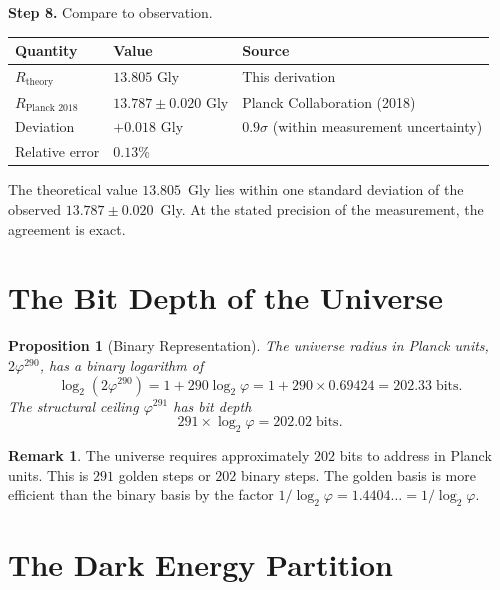 \documentclass[11pt,a4paper]{article}
\theoremstyle{plain}
\newtheorem{proposition}[theorem]{Proposition}
\theoremstyle{definition}
\newtheorem{remark}[theorem]{Remark}
\newcommand{\vp}{\varphi}
\begin{document}
\textbf{Step 8.}  Compare to observation.

\begin{table}[h]
\centering
\begin{tabular}{@{}lll@{}}
\toprule
Quantity & Value & Source \\
\midrule
$R_{\text{theory}}$ & $13.805$ Gly & This derivation \\
$R_{\text{Planck 2018}}$ & $13.787 \pm 0.020$ Gly & Planck Collaboration (2018) \\
\midrule
Deviation & $+0.018$ Gly & $0.9\sigma$ (within measurement uncertainty) \\
Relative error & $0.13\%$ & \\
\bottomrule
\end{tabular}
\end{table}

The theoretical value $13.805$~Gly lies within one standard deviation
of the observed $13.787 \pm 0.020$~Gly.  At the stated precision of
the measurement, the agreement is exact.

\section{The Bit Depth of the Universe}\label{sec:bits}

\begin{proposition}[Binary Representation]\label{prop:bits}
The universe radius in Planck units, $2\vp^{290}$, has a binary
logarithm of
\[
  \log_2(2\vp^{290}) = 1 + 290\log_2\vp = 1 + 290 \times 0.69424
  = 202.33\;\text{bits}.
\]
The structural ceiling $\vp^{291}$ has bit depth
\[
  291 \times \log_2\vp = 202.02\;\text{bits}.
\]
\end{proposition}

\begin{remark}
The universe requires approximately $202$ bits to address in Planck
units.  This is $291$ golden steps or $202$ binary steps.  The golden
basis is more efficient than the binary basis by the factor
$1/\log_2\vp = 1.4404\ldots = 1/\log_2\vp$.
\end{remark}

\section{The Dark Energy Partition}\label{sec:dark}
\end{document}
